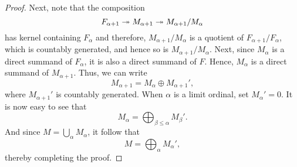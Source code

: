 \begin{proof}
    Next, note that the composition
    \begin{equation*}
        F_{\alpha + 1}\twoheadrightarrow M_{\alpha + 1}\twoheadrightarrow M_{\alpha + 1}/M_\alpha
    \end{equation*}
    has kernel containing $F_\alpha$ and therefore, $M_{\alpha + 1}/M_\alpha$ is a quotient of $F_{\alpha + 1}/F_\alpha$, which is countably generated, and hence so is $M_{\alpha + 1}/M_\alpha$. Next, since $M_\alpha$ is a direct summand of $F_\alpha$, it is also a direct summand of $F$. Hence, $M_\alpha$ is a direct summand of $M_{\alpha + 1}$. Thus, we can write 
    \begin{equation*}
        M_{\alpha + 1} = M_\alpha\oplus M_{\alpha + 1}',
    \end{equation*}
    where $M_{\alpha + 1}'$ is countably generated. When $\alpha$ is a limit ordinal, set $M_{\alpha}' = 0$. It is now easy to see that 
    \begin{equation*}
        M_\alpha = \bigoplus_{\beta\le\alpha} M_\beta'.
    \end{equation*}
    And since $\displaystyle M = \bigcup_{\alpha} M_\alpha$, it follow that 
    \begin{equation*}
        M = \bigoplus_{\alpha} M_\alpha',
    \end{equation*}
    thereby completing the proof.
\end{proof}

